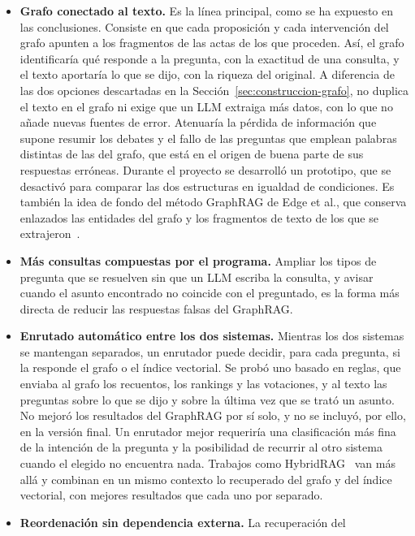 \documentclass[11pt, a4paper]{report}
\begin{document}
	\begin{itemize}
		\item \textbf{Grafo conectado al texto.} Es la línea principal, como se ha expuesto en las
		conclusiones. Consiste en que cada proposición y cada intervención del
		grafo apunten a los fragmentos de las actas de los que proceden. Así, el
		grafo identificaría qué responde a la pregunta, con la exactitud de una consulta, y el texto aportaría lo que se dijo, con la riqueza del
		original. A diferencia de las dos opciones descartadas en la
		Sección~\ref{sec:construccion-grafo}, no duplica el texto en el grafo ni
		exige que un LLM extraiga más datos, con lo que no añade nuevas fuentes
		de error. Atenuaría la pérdida de información que supone resumir los
		debates y el fallo de las preguntas que emplean palabras distintas de las del grafo, que está en el origen de buena parte de sus respuestas erróneas.
		Durante el proyecto se desarrolló un prototipo, que se desactivó para
		comparar las dos estructuras en igualdad de condiciones. Es también la
		idea de fondo del método GraphRAG de Edge et al., que conserva enlazados
		las entidades del grafo y los fragmentos de texto de los que se
		extrajeron~\cite{edge2024-graphrag}.
		\item \textbf{Más consultas compuestas por el programa.} Ampliar los
		tipos de pregunta que se resuelven sin que un LLM escriba la consulta, y
		avisar cuando el asunto encontrado no coincide con el preguntado, es la
		forma más directa de reducir las respuestas falsas del GraphRAG.
		\item \textbf{Enrutado automático entre los dos sistemas.} Mientras los dos sistemas se mantengan
		separados, un enrutador puede decidir, para cada pregunta, si la responde
		el grafo o el índice vectorial. Se probó uno basado en reglas, que enviaba
		al grafo los recuentos, los rankings y las votaciones, y al texto las
		preguntas sobre lo que se dijo y sobre la última vez que se trató un
		asunto. No mejoró los resultados del GraphRAG por sí solo, y no se incluyó, por ello, en la versión final. Un enrutador mejor requeriría una
		clasificación más fina de la intención de la pregunta y la posibilidad de
		recurrir al otro sistema cuando el elegido no encuentra nada. Trabajos
		como HybridRAG~\cite{sarmah2024-hybridrag} van más allá y combinan en un
		mismo contexto lo recuperado del grafo y del índice vectorial, con
		mejores resultados que cada uno por separado.
		\item \textbf{Reordenación sin dependencia externa.} La recuperación del

\end{itemize}
\end{document}
